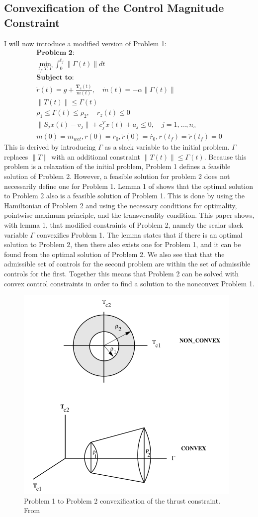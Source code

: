 \documentclass[journal]{new-aiaa}
\begin{document}
\begin{singlespace}
\section{Convexification of the Control Magnitude Constraint}
I will now introduce a modified version of Problem 1:
\begin{align*}
 \textbf{Problem 2:} \\
 \min_{t_f, T, \Gamma}\int^{t_f}_0 \|\Gamma(t)\| dt \\
 \textbf{Subject to:} \\
 \ddot{r}(t)= g + \frac{\boldsymbol T_c (t)}{m(t)}, \quad \dot{m}(t)=-\alpha \|\Gamma (t)\| \\
 \|T(t)\| \leq \Gamma(t) \\ 
 \rho_1 \leq \Gamma(t) \leq \rho_2, \quad  r_z(t) \leq 0 \\
 \|S_jx(t)-v_j\| + c_j^Tx(t)+a_j\leq 0, \quad j = 1,...,n_s \\
 m(0) = m_{wet}, r(0) = r_0, \dot{r}(0) = \dot{r_0}, r(t_f) =\dot{r}(t_f) = 0
\end{align*}
This is derived by introducing $\Gamma$ as a slack variable to the initial problem. $\Gamma$ replaces $\|T\|$ with an additional constraint $\|T(t)\| \leq \Gamma(t)$. Because this problem is a relaxation of the initial problem, Problem 1 defines a feasible solution of Problem 2. However, a feasible solution for problem 2 does not necessarily define one for Problem 1. Lemma 1 of \citep{ploen2007} shows that the optimal solution to Problem 2 also is a feasible solution of Problem 1. This is done by using the Hamiltonian of Problem 2 and using the necessary conditions for optimality, pointwise maximum principle, and the transversality condition. This paper shows, with lemma 1, that modified constraints of Problem 2, namely the scalar slack variable $\Gamma$ convexifies Problem 1. The lemma states that if there is an optimal solution to Problem 2, then there also exists one for Problem 1, and it can be found from the optimal solution of Problem 2. We also see that that the admissible set of controls for the second problem are within the set of admissible controls for the first. Together this means that Problem 2 can be solved with convex control constraints in order to find a solution to the nonconvex Problem 1. 

\begin{figure}[hbt!] 
\centering
\includegraphics[scale=0.25, width=.5\textwidth]{convexification.PNG}
\caption{Problem 1 to Problem 2 convexification of the thrust constraint. From \citep{ploen2007}}
\label{fig:convexif}
\end{figure}


\end{singlespace}
\end{document}
